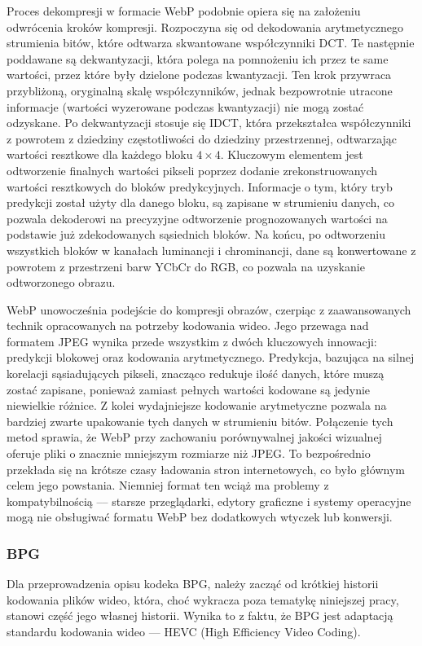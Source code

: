 Proces dekompresji w formacie WebP podobnie opiera się na założeniu odwrócenia kroków kompresji. Rozpoczyna się od dekodowania arytmetycznego strumienia bitów, które odtwarza skwantowane współczynniki DCT. Te następnie poddawane są dekwantyzacji, która polega na pomnożeniu ich przez te same wartości, przez które były dzielone podczas kwantyzacji. Ten krok przywraca przybliżoną, oryginalną skalę współczynników, jednak bezpowrotnie utracone informacje (wartości wyzerowane podczas kwantyzacji) nie mogą zostać odzyskane. Po dekwantyzacji stosuje się IDCT, która przekształca współczynniki z powrotem z dziedziny częstotliwości do dziedziny przestrzennej, odtwarzając wartości resztkowe dla każdego bloku \(4 \times 4 \). Kluczowym elementem jest odtworzenie finalnych wartości pikseli poprzez dodanie zrekonstruowanych wartości resztkowych do bloków predykcyjnych. Informacje o tym, który tryb predykcji został użyty dla danego bloku, są zapisane w strumieniu danych,
co pozwala dekoderowi na precyzyjne odtworzenie prognozowanych wartości na podstawie już zdekodowanych sąsiednich bloków. Na końcu, po odtworzeniu wszystkich bloków w kanałach luminancji i chrominancji, dane są konwertowane z powrotem z przestrzeni barw YCbCr do RGB, co pozwala na uzyskanie odtworzonego obrazu.

WebP unowocześnia podejście do kompresji obrazów, czerpiąc z zaawansowanych technik opracowanych na potrzeby kodowania wideo. Jego przewaga nad formatem JPEG wynika przede wszystkim z dwóch kluczowych innowacji: predykcji blokowej oraz kodowania arytmetycznego. Predykcja, bazująca na silnej korelacji sąsiadujących pikseli, znacząco redukuje ilość danych, które  muszą zostać zapisane, ponieważ zamiast pełnych wartości kodowane są jedynie niewielkie różnice. Z kolei wydajniejsze kodowanie arytmetyczne pozwala na bardziej zwarte upakowanie tych danych w strumieniu bitów. Połączenie tych metod sprawia, że WebP przy zachowaniu porównywalnej jakości wizualnej oferuje pliki o znacznie mniejszym rozmiarze niż JPEG. To bezpośrednio przekłada się na krótsze czasy ładowania stron internetowych, co było głównym celem jego powstania. Niemniej format ten wciąż ma problemy z kompatybilnością –-- starsze przeglądarki, edytory graficzne i systemy operacyjne mogą nie obsługiwać formatu WebP bez dodatkowych wtyczek lub konwersji.

\subsubsection{BPG}
Dla przeprowadzenia opisu kodeka BPG, należy zacząć od krótkiej historii kodowania plików wideo, która, choć wykracza poza tematykę niniejszej pracy, stanowi część jego własnej historii. Wynika to z faktu, że BPG jest adaptacją standardu kodowania wideo --- HEVC (High Efficiency Video Coding).

